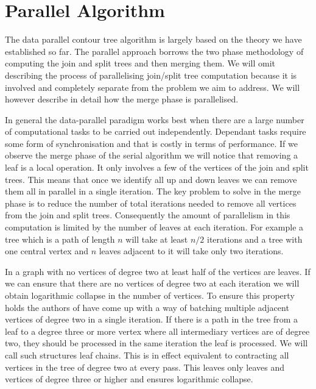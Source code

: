 \section{Parallel Algorithm}

The data parallel contour tree algorithm \cite{parallel-peak-pruning} is largely based on the theory we have established so far. The parallel approach borrows the two phase methodology of computing the join and split trees and then merging them. We will omit describing the process of parallelising join/split tree computation because it is involved and completely separate from the problem we aim to address. We will however describe in detail how the merge phase is parallelised.

In general the data-parallel paradigm works best when there are a large number of computational tasks to be carried out independently. Dependant tasks require some form of synchronisation and that is costly in terms of performance. If we observe the merge phase of the serial algorithm we will notice that removing a leaf is a local operation. It only involves a few of the vertices of the join and split trees. This means that once we identify all up and down leaves we can remove them all in parallel in a single iteration. The key problem to solve in the merge phase is to reduce the number of total iterations needed to remove all vertices from the join and split trees. Consequently the amount of parallelism in this computation is limited by the number of leaves at each iteration. For example a tree which is a path of length $n$ will take at least $n/2$ iterations and a tree with one central vertex and $n$ leaves adjacent to it will take only two iterations.

In a graph with no vertices of degree two at least half of the vertices are leaves. If we can ensure that there are no vertices of degree two at each iteration we will obtain logarithmic collapse in the number of vertices. To ensure this property holds the authors of \cite{parallel-peak-pruning} have come up with a way of batching multiple adjacent vertices of degree two in a single iteration. If there is a path in the tree from a leaf to a degree three or more vertex where all intermediary vertices are of degree two, they should be processed in the same iteration the leaf is processed. We will call such structures leaf chains. This is in effect equivalent to contracting all vertices in the tree of degree two at every pass. This leaves only leaves and vertices of degree three or higher and ensures logarithmic collapse.

